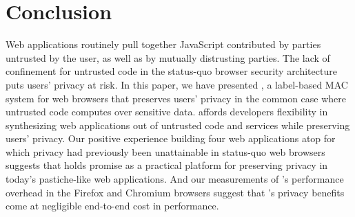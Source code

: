 \section{Conclusion}
\label{sec:conclusion}

Web applications routinely pull together JavaScript contributed by
parties untrusted by the user, as well as by mutually distrusting
parties.
The lack of confinement for untrusted code in the status-quo
browser security architecture puts users' privacy at risk.
In this paper, we have presented
\sys{}, a label-based MAC system for web browsers that preserves
users' privacy in the common case where untrusted code computes over
sensitive data. \sys{} affords developers flexibility in synthesizing
web applications out of untrusted code and services while preserving
users' privacy. Our positive experience building four web applications
atop \sys{} for which privacy had previously been unattainable in
status-quo web browsers suggests that \sys{} holds promise as a
practical platform for preserving privacy in today's pastiche-like web
applications. And our measurements of \sys{}'s performance overhead in
the Firefox and Chromium browsers suggest that \sys{}'s privacy
benefits come at negligible end-to-end cost in performance.

